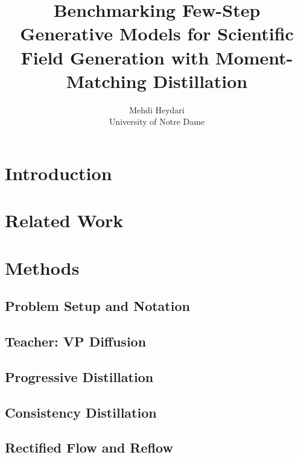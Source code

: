 \documentclass{article}
\title{Benchmarking Few-Step Generative Models for Scientific Field Generation with Moment-Matching Distillation}
\author{Mehdi Heydari \\ University of Notre Dame}
\date{}
\begin{document}
\maketitle

\begin{abstract}
\lipsum[1]
\end{abstract}

\section{Introduction}
\label{sec:intro}

\lipsum[2-5]

\section{Related Work}
\label{sec:related}

\lipsum[6-9]

\section{Methods}
\label{sec:methods}

\subsection{Problem Setup and Notation}
\lipsum[10-11]

\subsection{Teacher: VP Diffusion}
\lipsum[12-13]

\subsection{Progressive Distillation}
\lipsum[14-15]

\subsection{Consistency Distillation}
\lipsum[16-17]

\subsection{Rectified Flow and Reflow}
\lipsum[18-19]
\end{document}

